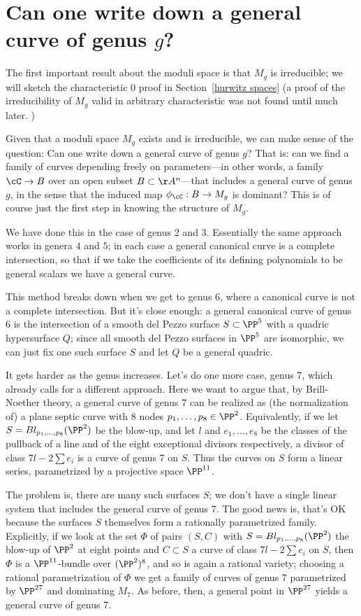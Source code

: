 \section{Can one write down a general curve of genus $g$?}

The first important result about the moduli space is that $M_g$ is irreducible; we will sketch the characteristic 0 proof in Section~\ref{hurwitz spaces}  (a proof of the irreducibility of $M_g$ valid in arbitrary characteristic was not found until much later. )

Given that a moduli space $M_g$ exists and is irreducible, we can make sense of the question: Can one write down a general curve of genus $g$?
That is: can we find a family of curves depending freely on parameters---in other words, a family $\cC \to B$ over an open subset $B \subset \AA^n$---that includes a general curve of genus $g$, in the sense that the induced map $\phi_\cC : B \to M_g$ is dominant? This is of course just the first step in knowing the structure of $M_g$.

We have done this in the case of genus 2 and 3. Essentially
the same approach works in genera $4$ and $5$; in each case a general canonical curve is a complete intersection, so that if we take the coefficients of its defining polynomials to be general scalars we have a general curve.

This method breaks down when we get to genus 6, where a canonical curve is not a complete intersection. But it's close enough: a general canonical curve of genus 6 is the intersection of a smooth del Pezzo surface $S \subset \PP^5$ with a quadric hypersurface $Q$; since all smooth del Pezzo surfaces in $\PP^5$ are isomorphic, we can just fix one such surface $S$ and let $Q$ be a general quadric.

It gets harder as the genus increases. Let's do one more case, genus 7, which already calls for a different approach. Here we want to argue that, by Brill-Noether theory, a general curve of genus $7$ can be realized as (the normalization of) a plane septic curve with 8 nodes $p_1,\dots,p_8 \in \PP^2$. Equivalently, if we let $S = Bl_{p_1,\dots,p_8}(\PP^2)$ be the blow-up, and let $l$ and $e_1,\dots,e_8$ be the classes of the pullback of a line and of the eight exceptional divisors respectively, a divisor of class $7l - 2 \sum e_i$ is a curve of genus 7 on $S$. Thus the curves on $S$ form a linear series, parametrized by a projective space $\PP^{11}$.

The problem is, there are many such surfaces $S$; we don't have a single linear system that includes the general curve of genus 7. The good news is, that's OK because the surfaces $S$ themselves form a rationally parametrized family. Explicitly, if we look at the set $\Phi$ of pairs $(S, C)$ with $S = Bl_{p_1,\dots,p_8}(\PP^2)$  the blow-up of $\PP^2$ at eight points and $C \subset S$ a curve of class $7l - 2 \sum e_i$ on $S$, then $\Phi$ is a $\PP^{11}$-bundle over $(\PP^2)^8$, and so is again a rational variety; choosing a rational parametrization of $\Phi$ we get a family of curves of genus $7$ parametrized by $\PP^{27}$ and dominating $M_7$. As before, then, a general point in $\PP^{27}$ yields a general curve of genus 7.

